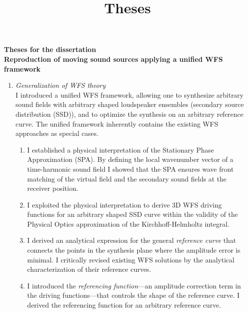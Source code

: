 \documentclass[a4paper,10pt]{article}
\title{Theses}
\date{}
\begin{document}
\begin{center}
  \textbf{\normalsize Theses for the dissertation \\
   		  \Large Reproduction of moving sound sources applying a unified WFS framework}\\[0.5cm]
\end{center}

\begin{enumerate}
\item \emph{Generalization of WFS theory} \\ 
I introduced a unified WFS framework, allowing one to synthesize arbitrary sound fields with arbitrary shaped loudspeaker ensembles (secondary source distribution (SSD)), and to optimize the synthesis on an arbitrary reference curve. 
The unified framework inherently contains the existing WFS approaches as special cases.
\begin{enumerate}
\item \label{th:SPAinterpret} I established a physical interpretation of the Stationary Phase Approximation (SPA).
By defining the local wavenumber vector of a time-harmonic sound field I showed that the SPA ensures wave front matching of the virtual field and the secondary sound fields at the receiver position.
\item I exploited the physical interpretation to derive 3D WFS driving functions for an arbitrary shaped SSD curve within the validity of the Physical Optics approximation of the Kirchhoff-Helmholtz integral.
\item
I derived an analytical expression for the general \emph{reference curve} that connects the points in the synthesis plane where the amplitude error is minimal.
I critically revised existing WFS solutions by the analytical characterization of their reference curves.
\item I introduced the \emph{referencing function}---an amplitude correction term in the driving functions---that controls the shape of the reference curve.
I derived the referencing function for an arbitrary reference curve.

\end{enumerate}
\end{enumerate}
\end{document}
